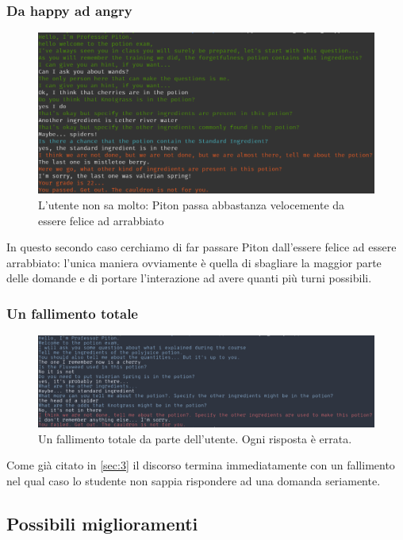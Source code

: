 \subsubsection{Da happy ad angry}
\begin{figure}[!htb]
    \centering
    \includegraphics[scale=0.45]{Images/from_happy_to_angry.png}
    \caption{L'utente non sa molto: Piton passa abbastanza velocemente da essere felice ad arrabbiato}
    \label{fig:from_happy_to_angry}
\end{figure}
In questo secondo caso cerchiamo di far passare Piton dall'essere felice ad essere arrabbiato: l'unica maniera ovviamente è quella di sbagliare la maggior parte delle domande e di portare l'interazione ad avere quanti più turni possibili.
\subsubsection{Un fallimento totale}
\begin{figure}[!htb]
    \centering
    \includegraphics[scale=0.40]{Images/a_complete_fail.png}
    \caption{Un fallimento totale da parte dell'utente. Ogni risposta è errata.}
    \label{fig:a_complete_failure}
\end{figure}
Come già citato in \ref{sec:3} il discorso termina immediatamente con un fallimento nel qual caso lo studente non sappia rispondere ad una domanda seriamente.
\subsection{Possibili miglioramenti}
